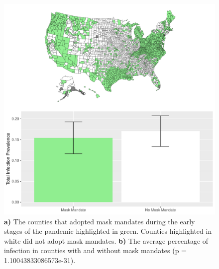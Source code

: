\documentclass[
  12pt,
]{article}
\begin{document}
\begin{figure}[H]

{\centering \includegraphics{Final-Manuscript_files/figure-latex/fig3-1} 

}

\caption{\textbf{a)} The counties that adopted mask mandates during the early stages of the pandemic highlighted in green. Counties highlighted in white did not adopt mask mandates. \textbf{b)} The average percentage of infection in counties with and without mask mandates (p = 1.10043833086573e-31).}\label{fig:fig3}
\end{figure}
\end{document}
